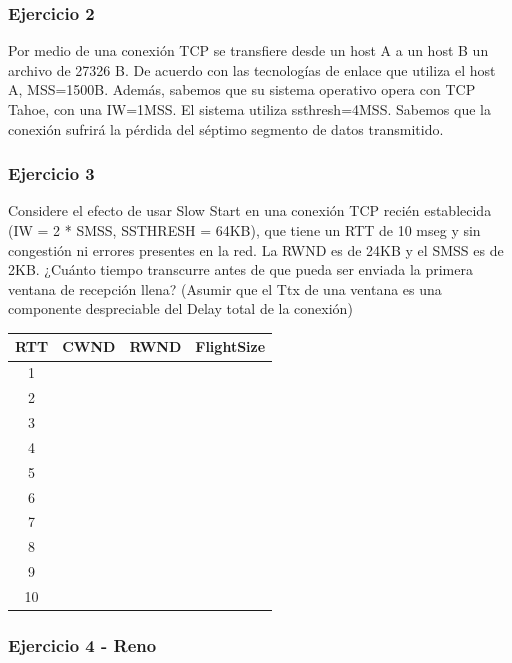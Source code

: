 \documentclass[titlepage,a4paper]{article}
\begin{document}
\subsubsection{Ejercicio 2}
Por medio de una conexión TCP se transfiere desde un host A a un host B un archivo de 27326 B. De acuerdo con las tecnologías de enlace que utiliza el host A, MSS=1500B. Además, sabemos que su sistema operativo opera con TCP Tahoe, con una IW=1MSS. El sistema utiliza ssthresh=4MSS. Sabemos que la conexión sufrirá la pérdida del séptimo segmento de datos transmitido.

\subsubsection{Ejercicio 3}

Considere el efecto de usar Slow Start en una conexión TCP recién establecida (IW = 2 * SMSS, SSTHRESH = 64KB), que tiene un RTT de 10 mseg y sin congestión ni errores presentes en la red. La RWND es de 24KB y el SMSS es de 2KB. ¿Cuánto tiempo transcurre antes de que pueda ser enviada la primera ventana de recepción llena? (Asumir que el Ttx de una ventana es una componente despreciable del Delay total de la conexión)


\begin{center}
    \begin{tabular}{c|c|c|c}
        RTT & CWND & RWND & FlightSize \\
        \hline
        \hline
        1 & & & \\
         \hline
        2 & & & \\
         \hline
        3 & & & \\
         \hline
        4 & & & \\
         \hline
        5 & & & \\
         \hline
        6 & & & \\
         \hline
        7 & & & \\
         \hline
        8 & & & \\
         \hline
        9 & & & \\
         \hline
        10 & & & \\
    \end{tabular}
\end{center}


\subsubsection{Ejercicio 4 - Reno}
\end{document}
